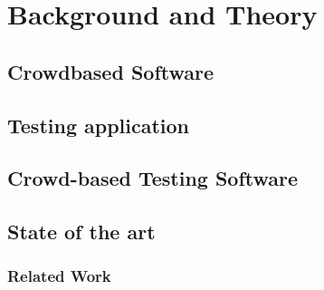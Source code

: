 
\chapter{Background and Theory }
\section{Crowdbased Software}
\section{Testing application}
\section{Crowd-based Testing Software}
\section{State of the art}
\subsection{Related Work}
\cleardoublepage




